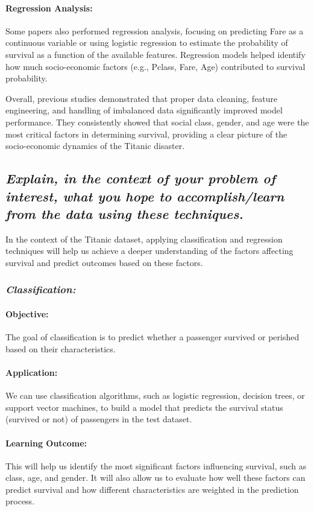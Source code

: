 \documentclass[twoside,11pt]{article}
\makeatletter
\let\@oldsubsection\subsection
\renewcommand\subsection[1]{\@oldsubsection*{\textit{#1}}}
\let\@oldsubsubsection\subsubsection
\renewcommand\subsubsection[1]{\@oldsubsubsection*{\textit{#1}}}
\makeatother
\begin{document}
\paragraph{Regression Analysis:} Some papers also performed regression analysis, focusing on predicting Fare as a continuous variable or using logistic regression to estimate the probability of survival as a function of the available features. Regression models helped identify how much socio-economic factors (e.g., Pclass, Fare, Age) contributed to survival probability.

Overall, previous studies demonstrated that proper data cleaning, feature engineering, and handling of imbalanced data significantly improved model performance. They consistently showed that social class, gender, and age were the most critical factors in determining survival, providing a clear picture of the socio-economic dynamics of the Titanic disaster.

\subsection{Explain, in the context of your problem of interest, what you hope to accomplish/learn from the data using these techniques.}
In the context of the Titanic dataset, applying classification and regression techniques will help us achieve a deeper understanding of the factors affecting survival and predict outcomes based on these factors.

\subsubsection{Classification:}

\paragraph{Objective:} The goal of classification is to predict whether a passenger survived or perished based on their characteristics.

\paragraph{Application:} We can use classification algorithms, such as logistic regression, decision trees, or support vector machines, to build a model that predicts the survival status (survived or not) of passengers in the test dataset.

\paragraph{Learning Outcome:} This will help us identify the most significant factors influencing survival, such as class, age, and gender. It will also allow us to evaluate how well these factors can predict survival and how different characteristics are weighted in the prediction process.
\end{document}
